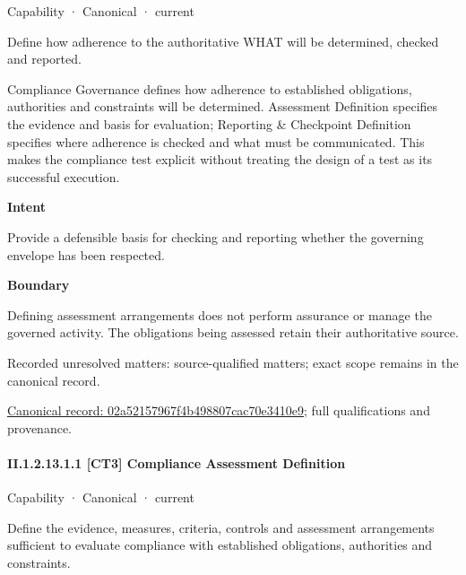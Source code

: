 \label{element:02a52157967f4b498807cac70e3410e9}
{\small Capability · Canonical · current}\par

Define how adherence to the authoritative WHAT will be determined, checked and reported.



Compliance Governance defines how adherence to established obligations, authorities and constraints will be determined. Assessment Definition specifies the evidence and basis for evaluation; Reporting \& Checkpoint Definition specifies where adherence is checked and what must be communicated. This makes the compliance test explicit without treating the design of a test as its successful execution.



\textbf{Intent}



Provide a defensible basis for checking and reporting whether the governing envelope has been respected.



\textbf{Boundary}



Defining assessment arrangements does not perform assurance or manage the governed activity. The obligations being assessed retain their authoritative source.


{\small Recorded unresolved matters: source-qualified matters; exact scope remains in the canonical record.}\par
{\footnotesize \href{../../../../continuum/strategy/capability/02a52157967f4b498807cac70e3410e9.md}{Canonical record: 02a52157967f4b498807cac70e3410e9}; full qualifications and provenance.}\par
\paragraph*{II.1.2.13.1.1 [CT3] Compliance Assessment Definition}
\label{navigation:II.1.2.13.1.1}

\label{element:8a6db4bd0ed845dda125896c4e3ad3d0}
{\small Capability · Canonical · current}\par

Define the evidence, measures, criteria, controls and assessment arrangements sufficient to evaluate compliance with established obligations, authorities and constraints.




